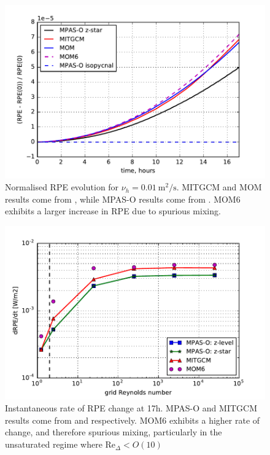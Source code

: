 \begin{figure}
  \includegraphics{../plots/lock_exchange_rpe_norm.pdf}
  \caption{\label{fig:lock-rpenorm} Normalised RPE evolution for $\nu_h = \SI{0.01}{\square\metre\per\second}$. MITGCM and MOM results come from \citet{ilicak12}, while MPAS-O results come from \citet{petersen15}. MOM6 exhibits a larger increase in RPE due to spurious mixing.}
\end{figure}

\begin{figure}
  \includegraphics{../plots/lock_exchange_drpe.pdf}
  \caption{\label{fig:lock-drpe} Instantaneous rate of RPE change at 17h. MPAS-O and MITGCM results come from \citet{petersen15} and \citet{ilicak12} respectively. MOM6 exhibits a higher rate of change, and therefore spurious mixing, particularly in the unsaturated regime where $\mathrm{Re}_\Delta < O(10)$}
\end{figure}

